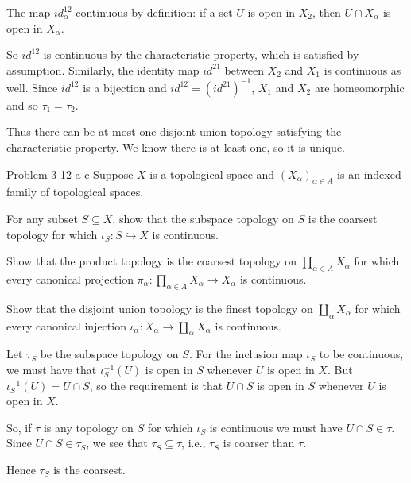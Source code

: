 \documentclass{homework651}
\newcommand\nextprob{\newpage}
\begin{document}
\begin{aproblems}
\centerline{}

The map $id^{12}_\alpha$ continuous by definition: if a set $U$ is open in $X_2$,
then $U\cap X_\alpha$ is open in $X_\alpha$.

So $id^{12}$ is continuous
by the characteristic property, which is satisfied by assumption.
Similarly, the identity map $id^{21}$ between $X_2$ and $X_1$ is continuous
as well.  Since $id^{12}$ is a bijection and $id^{12}=(id^{21})^{-1}$, $X_1$
and $X_2$ are homeomorphic and so $\tau_1=\tau_2$.

Thus there can be at most one disjoint union topology satisfying the characteristic
property.  We know there is at least one, so it is unique.

\nextprob
\hproblem Problem 3-12 a-c
Suppose $X$ is a topological space and $(X_{\alpha})_{\alpha\in A}$ is an
indexed family of topological spaces.
\begin{subproblems}
\item For any subset $S\subseteq X$, show that the subspace topology on $S$ is
the coarsest topology for which $\iota_S:S\hookrightarrow X$ is continuous.

\item Show that the product topology is the coarsest topology on
$\prod_{\alpha\in A}X_\alpha$ for which every canonical projection
$\pi_\alpha:\prod_{\alpha\in A}X_\alpha\rightarrow X_\alpha$ is continuous.
		
\item Show that the disjoint union topology is the finest topology on
$\coprod_\alpha X_\alpha$ for which every canonical injection
$\iota_\alpha:X_\alpha\rightarrow\coprod_\alpha X_\alpha$ is continuous.
\end{subproblems}

\subsol
Let $\tau_S$ be the subspace topology on $S$.  For the inclusion map $\iota_S$ to
be continuous, we must have that $\iota_S^{-1}(U)$ is open in $S$ whenever
$U$ is open in $X$.  But $\iota_S^{-1}(U)=U\cap S$, so the requirement is
that $U\cap S$ is open in $S$ whenever $U$ is open in $X$.

So, if $\tau$ is any topology on $S$ for which $\iota_S$ is continuous we must
have $U\cap S\in\tau$.  Since $U\cap S\in\tau_S$, we see that
$\tau_S\subseteq\tau$, i.e., $\tau_S$ is coarser than $\tau$.

Hence $\tau_S$ is the coarsest.


\end{aproblems}
\end{document}
